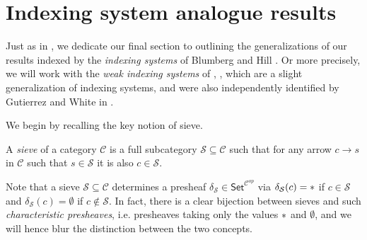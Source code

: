 \documentclass[a4paper,10pt
]{article}%
\begin{document}




\section{Indexing system analogue results}\label{INDEX SEC}


Just as in \cite[\S 9]{Per17}, we dedicate our final section
to outlining the generalizations of our results indexed by the 
\textit{indexing systems} of Blumberg and Hill \cite{BH15}.
Or more precisely, we will work with the \textit{weak indexing systems}
of \cite[\S 9]{Per17}, \cite[\S 4.4]{BP17},
which are a slight generalization of indexing systems, 
and were also independently identified by Gutierrez and White in \cite{GW17}.

We begin by recalling the key notion of sieve.

\begin{definition}
A \textit{sieve} of a category $\mathcal{C}$
is a full subcategory $\mathcal{S} \subseteq \mathcal{C}$ such that for any arrow $c \to s$ in $\mathcal{C}$ such that $s \in \mathcal{S}$ it is also $c \in \mathcal{S}$.
\end{definition}

Note that a sieve $\mathcal{S} \subseteq \mathcal{C}$
determines a presheaf 
$\delta_{\mathcal{S}} \in \mathsf{Set}^{\mathcal{C}^{op}}$ 
via 
$\delta_{\mathcal{S}}(c) = \**$ if $c \in \mathcal{S}$ and
$\delta_{\mathcal{S}}(c) = \emptyset$ if $c \not \in \mathcal{S}$.
In fact, there is a clear bijection between sieves and such 
\textit{characteristic presheaves}, i.e. presheaves taking only the values $\**$ and $\emptyset$, 
and we will hence blur the distinction between the two concepts.
\end{document}
